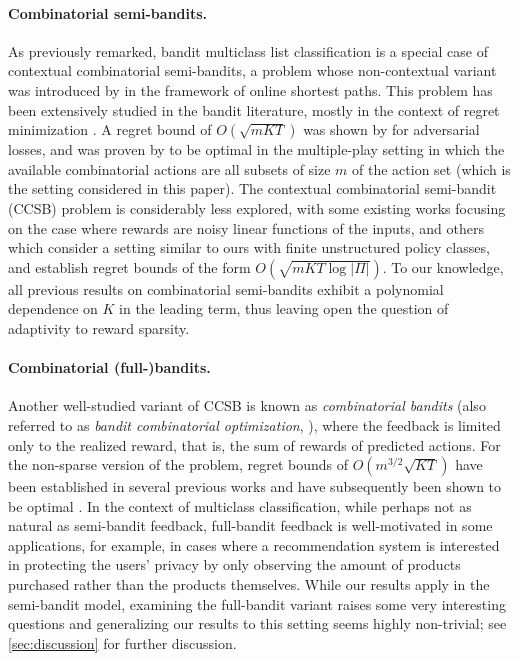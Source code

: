 \documentclass[11pt]{article}
\theoremstyle{plain}
\begin{document}
\paragraph{Combinatorial semi-bandits.} As previously remarked, bandit multiclass list classification is a special case of contextual combinatorial semi-bandits, a problem whose non-contextual variant was introduced by \cite{gyorgy2007line} in the framework of online shortest paths. This problem has been extensively studied in the bandit literature, mostly in the context of regret minimization \citep[etc.]{audibert2014regret,wen2015efficient,kveton2015tight,neu2015first, wei2018more, ito2021hybrid}. A regret bound of $O(\sqrt{mKT})$ was shown by \cite{audibert2014regret} for adversarial losses, and was proven by \cite{lattimore2018toprank} to be optimal in the multiple-play setting in which the available combinatorial actions are all subsets of size $m$ of the action set (which is the setting considered in this paper). The contextual combinatorial semi-bandit (CCSB) problem is considerably less explored, with some existing works \citep{qin2014contextual,wen2015efficient,takemura2021near,zierahn2023nonstochastic} focusing on the case where rewards are noisy linear functions of the inputs, and others \citep{kale2010non,krishnamurthy2016contextual} which consider a setting similar to ours with finite unstructured policy classes, and establish regret bounds of the form $O(\sqrt{mKT \log |\Pi|})$. To our knowledge, all previous results on combinatorial semi-bandits exhibit a polynomial dependence on $K$ in the leading term, thus leaving open the question of adaptivity to reward sparsity.

\paragraph{Combinatorial (full-)bandits.} Another well-studied variant of CCSB is known as \emph{combinatorial bandits} (also referred to as \emph{bandit combinatorial optimization}, \cite{mcmahan2004online,awerbuch2004adaptive}), where the feedback is limited only to the realized reward, that is, the sum of rewards of predicted actions. For the non-sparse version of the problem, regret bounds of $O(m^{3/2} \sqrt{KT})$ have been established in several previous works \citep{dani2007price,abernethy2008competing,bubeck2012towards,cesa2012combinatorial,hazan2016volumetric} and have subsequently been shown to be optimal \citep{cohen2017tight,ito2019improved}. In the context of multiclass classification, while perhaps not as natural as semi-bandit feedback, full-bandit feedback is well-motivated in some applications, for example, in cases where a recommendation system is interested in protecting the users' privacy by only observing the amount of products purchased rather than the products themselves. While our results apply in the semi-bandit model, examining the full-bandit variant raises some very interesting questions and generalizing our results to this setting seems highly non-trivial; see \cref{sec:discussion} for further discussion.
\end{document}
